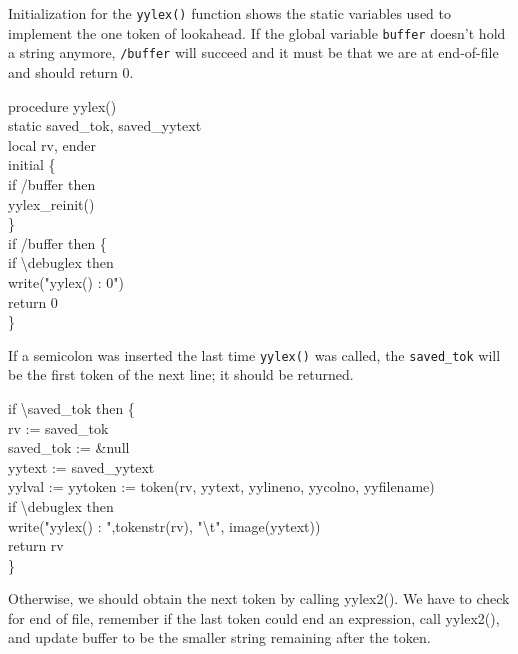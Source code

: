 Initialization for the \texttt{yylex()} function shows the static
variables used to implement the one token of lookahead. If the global
variable \texttt{buffer} doesn't hold a string anymore,
\texttt{/buffer} will succeed and it must be that we are at
end-of-file and should return 0.

\begin{iconcode}
procedure yylex() \\
static saved\_tok, saved\_yytext \\
local rv, ender \\
initial \{ \\
\>   if /buffer then \\
\> \>    yylex\_reinit() \\
\> \>    \} \\
\>   if /buffer then \{ \\
\> \>     if {\textbackslash}debuglex then \\
\> \> \>       write("yylex() : 0") \\
\> \>     return 0 \\
\> \>     \}
\end{iconcode}


If a semicolon was inserted the last time \texttt{yylex()} was called,
the \texttt{saved\_tok} will be the first token of the next line; it
should be returned.

\begin{iconcode}
\>   if {\textbackslash}saved\_tok then \{ \\
\> \>   rv := saved\_tok \\
\> \>   saved\_tok := \&null \\
\> \>   yytext := saved\_yytext \\
\> \>   yylval := yytoken := token(rv, yytext, yylineno, yycolno, yyfilename) \\
\> \>   if {\textbackslash}debuglex then \\
\> \> \>    write("yylex() : ",tokenstr(rv),
                  "{\textbackslash}t", image(yytext)) \\
\> \>   return rv \\
\> \> \}
\end{iconcode}

Otherwise, we should obtain the next token by calling yylex2(). We
have to check for end of file, remember if the last token could end an
expression, call yylex2(), and update buffer to be the smaller string
remaining after the token.

